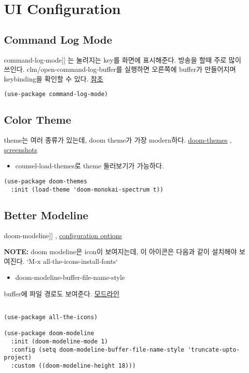 \documentclass[11pt]{article}
\begin{document}
\section*{UI Configuration}
\label{sec:org40acedb}
\subsection*{Command Log Mode}
\label{sec:org6c3f359}
command-log-mode]] 는 눌려지는 key를 화면에 표시해준다. 방송을 할때 주로 많이 쓰인다.
clm/open-command-log-buffer를 실행하면 오른쪽에 buffer가 만들어지며 keybinding을 확인할 수 있다.
\href{https://github.com/lewang/command-log-mode}{참조}
\begin{verbatim}
(use-package command-log-mode)
\end{verbatim}

\subsection*{Color Theme}
\label{sec:org934f90a}
theme는 여러 종류가 있는데, doom theme가 가장 modern하다.
\href{https://github.com/hlissner/emacs-doom-themes}{doom-themes} , \href{https://github.com/hlissner/emacs-doom-themes/tree/screenshots}{screenshots} 
\begin{itemize}
\item counsel-load-themes로 theme 둘러보기가 가능하다.
\end{itemize}
\begin{verbatim}
(use-package doom-themes
  :init (load-theme 'doom-monokai-spectrum t))
\end{verbatim}
\subsection*{Better Modeline}
\label{sec:org31c1a57}
doom-modeline]] , \href{https://github.com/seagle0128/doom-modeline\#customize}{configuration options} 

\textbf{NOTE:} doom modeline은 icon이 보여지는데, 이 아이콘은 다음과 같이 설치해야 보여진다. 
`M-x all-the-icons-install-fonts` 

\begin{itemize}
\item doom-modeline-buffer-file-name-style
\end{itemize}
buffer에 파일 경로도 보여준다.
\href{https://github.com/seagle0128/doom-modeline}{모드라인}
\begin{verbatim}

(use-package all-the-icons)

(use-package doom-modeline
  :init (doom-modeline-mode 1)
  :config (setq doom-modeline-buffer-file-name-style 'truncate-upto-project)
  :custom ((doom-modeline-height 18)))

\end{verbatim}
\end{document}
